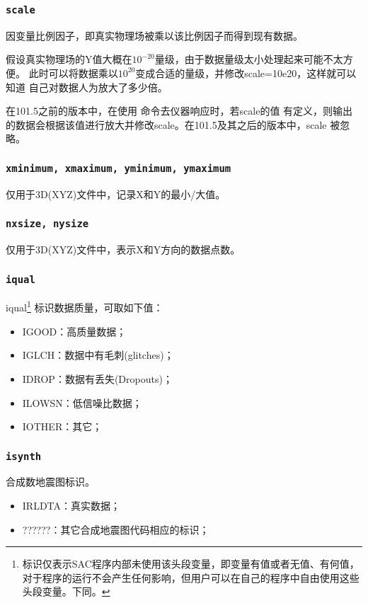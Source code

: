 \subsubsection{\texttt{scale}}
因变量比例因子，即真实物理场被乘以该比例因子而得到现有数据。

假设真实物理场的Y值大概在$10^{-20}$量级，由于数据量级太小处理起来可能不太方便。
此时可以将数据乘以$10^{20}$变成合适的量级，并修改scale=10e20，这样就可以知道
自己对数据人为放大了多少倍。

在101.5之前的版本中，在使用  命令去仪器响应时，若scale的值
有定义，则输出的数据会根据该值进行放大并修改scale。在101.5及其之后的版本中，scale
被忽略。

\subsubsection{\texttt{xminimum, xmaximum, yminimum, ymaximum}}
仅用于3D(XYZ)文件中，记录X和Y的最小/大值。

\subsubsection{\texttt{nxsize, nysize}}
仅用于3D(XYZ)文件中，表示X和Y方向的数据点数。

\subsubsection{\texttt{iqual}\dag}
iqual\footnote{\dag 标识仅表示SAC程序内部未使用该头段变量，即变量有值或者无值、有何值，
对于程序的运行不会产生任何影响，但用户可以在自己的程序中自由使用这些头段变量。下同。
}
标识数据质量，可取如下值：
\begin{itemize}
\ttfamily
\item IGOOD：高质量数据；
\item IGLCH：数据中有毛刺(glitches)；
\item IDROP：数据有丢失(Dropouts)；
\item ILOWSN：低信噪比数据；
\item IOTHER：其它；
\end{itemize}

\subsubsection{\texttt{isynth}\dag}
合成数地震图标识。
\begin{itemize}
\ttfamily
\item IRLDTA：真实数据；
\item ??????：其它合成地震图代码相应的标识；
\end{itemize}


